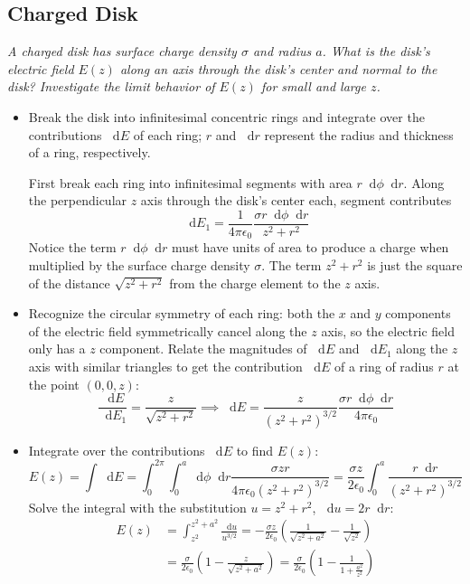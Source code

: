 \documentclass[11pt, a4paper]{article}
\newcommand{\diff}{\mathop{}\!\mathrm{d}} %
\newcommand{\ee}{\epsilon_{0}}  %
\begin{document}
\subsection{Charged Disk}
\textit{A charged disk has surface charge density $ \sigma $ and radius $ a $. What is the disk's electric field $ E(z) $ along an axis through the disk's center and normal to the disk? Investigate the limit behavior of $ E(z) $ for small and large $ z $.}
\begin{itemize}
	\item Break the disk into infinitesimal concentric rings and integrate over the contributions $ \diff E $ of each ring; $ r $ and $ \diff r $ represent the radius and thickness of a ring, respectively.
	
	First break each ring into infinitesimal segments with area $ r \diff \phi \diff r $. Along the perpendicular $ z $ axis through the disk's center each, segment contributes
	\begin{equation*}
		\diff E_{1} = \frac{1}{4\pi \ee} \frac{\sigma r\diff \phi \diff r }{z^{2} + r^{2}}
	\end{equation*}
	Notice the term $ r\diff \phi \diff r $ must have units of area to produce a charge when multiplied by the surface charge density $ \sigma $. The term $ z^{2} + r^{2} $ is just the square of the distance $ \sqrt{z^{2} + r^{2}} $ from the charge element to the $ z $ axis.
	
	\item Recognize the circular symmetry of each ring: both the $ x $ and $ y $ components of the electric field symmetrically cancel along the $ z $ axis, so the electric field only has a $ z $ component. Relate the magnitudes of $ \diff E $ and $ \diff E_{1} $ along the $ z $ axis with similar triangles to get the contribution $ \diff E $ of a ring of radius $ r $ at the point $ (0, 0, z) $:
	\begin{equation*}
		\frac{\diff E}{\diff E_{1}} = \frac{z}{\sqrt{z^{2} + r^{2}}} \implies  \diff E = \frac{z}{(z^{2} + r^{2})^{3/2}} \frac{\sigma r\diff \phi \diff r }{4\pi \ee} 
	\end{equation*}
	
	\item Integrate over the contributions $ \diff E $ to find $ E(z) $:
	\begin{equation*}
		E(z) = \int \diff E = \int_{0}^{2\pi}\int_{0}^{a}\diff \phi \diff r \frac{\sigma z r}{4\pi \ee (z^{2} + r^{2})^{3/2}} = \frac{\sigma z}{2\ee} \int_{0}^{a}\frac{r \diff r}{(z^{2} + r^{2})^{3/2}}
	\end{equation*}
	Solve the integral with the substitution $ u = z^{2} + r^{2} $, $\diff u = 2r \diff r $:
	\begin{align*}
		E(z) &= \int_{z^{2}}^{z^{2} + a^{2}} \frac{\diff u}{u^{3/2}} = -\frac{\sigma z}{2 \ee} \left(\frac{1}{\sqrt{z^{2} + a^{2}}} - \frac{1}{\sqrt{z^{2}}}\right)\\
		&=\frac{\sigma}{2\ee} \left(1 - \frac{z}{\sqrt{z^{2} + a^{2}}}\right) = \frac{\sigma}{2\ee} \left(1 - \frac{1}{1 + \frac{a^{2}}{z^{2}}}\right)
	\end{align*}
	

\end{itemize}
\end{document}
